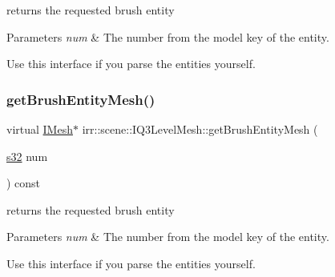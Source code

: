 returns the requested brush entity 


\begin{DoxyParams}{Parameters}
{\em num} & The number from the model key of the entity.\\
\hline
\end{DoxyParams}
Use this interface if you parse the entities yourself. \mbox{\label{classirr_1_1scene_1_1IQ3LevelMesh_ad0ed15c97e55ffb02d1d48fb62a769d5}} 
\subsubsection{\texorpdfstring{get\+Brush\+Entity\+Mesh()}{getBrushEntityMesh()}\hspace{0.1cm}{\footnotesize\ttfamily [2/2]}}
{\footnotesize\ttfamily virtual \hyperlink{classirr_1_1scene_1_1IMesh}{I\+Mesh}$\ast$ irr\+::scene\+::\+I\+Q3\+Level\+Mesh\+::get\+Brush\+Entity\+Mesh (\begin{DoxyParamCaption}\item[{\hyperlink{namespaceirr_ac66849b7a6ed16e30ebede579f9b47c6}{s32}}]{num }\end{DoxyParamCaption}) const\hspace{0.3cm}{\ttfamily [pure virtual]}}



returns the requested brush entity 


\begin{DoxyParams}{Parameters}
{\em num} & The number from the model key of the entity.\\
\hline
\end{DoxyParams}
Use this interface if you parse the entities yourself. \mbox{\label{classirr_1_1scene_1_1IQ3LevelMesh_aa2f9609e950e32876665d7531a54a484}} 
